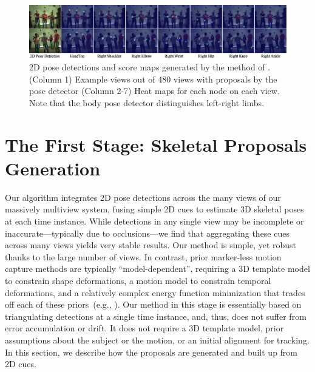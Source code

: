 \begin{figure}[t]
	\includegraphics[width=\linewidth]{figures/HeatMaps3}
	\caption{2D pose detections and score maps generated by the method of \cite{Wei-2016}. (Column 1) Example views out of 480 views with proposals by the pose detector (Column 2-7) Heat maps for each node on each view. Note that the body pose detector distinguishes left-right limbs.}\label{fig:poseDetection}
\end{figure}
\section{The First Stage: Skeletal Proposals Generation}
Our algorithm integrates 2D pose detections across the many views of our massively multiview system, fusing simple 2D cues to estimate 3D skeletal poses at each time instance.
While detections in any single view may be incomplete or inaccurate---typically due to occlusions---we find that aggregating these cues across many views yields very stable results. Our method is simple, yet robust thanks to the large number of views. In contrast, prior marker-less motion capture methods are typically ``model-dependent'', requiring a 3D template model to constrain shape deformations, a motion model to constrain temporal deformations, and a relatively complex energy function minimization that trades off each of these priors~(e.g., \cite{Gall-09,Furukawa-2008, Elhayek-16}). Our method in this stage is essentially based on triangulating detections at a single time instance, and, thus, does not suffer from error accumulation or drift. It does not require a 3D template model, prior assumptions about the subject or the motion, or an initial alignment for tracking. In this section, we describe how the proposals are generated and built up from 2D cues.  

